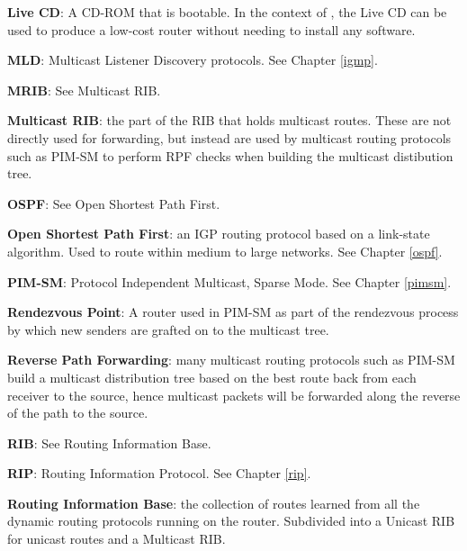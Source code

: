 \begin{description}
  \item{\bf Live CD}: A CD-ROM that is bootable.  In the context of
  \xorp, the Live CD can be used to produce a low-cost router without
  needing to install any software.

  \item{\bf MLD}: Multicast Listener Discovery protocols.  See Chapter
  \ref{igmp}.

  \item{\bf MRIB}: See Multicast RIB.

  \item{\bf Multicast RIB}: the part of the RIB that holds multicast routes.
  These are not directly used for forwarding, but instead are used by
  multicast routing protocols such as PIM-SM to perform RPF checks
  when building the multicast distibution tree.

  \item{\bf OSPF}: See Open Shortest Path First.

  \item{\bf Open Shortest Path First}: an IGP routing protocol based on
  a link-state algorithm.  Used to route within medium to large
  networks. See Chapter \ref{ospf}.

  \item{\bf PIM-SM}: Protocol Independent Multicast, Sparse Mode. See
  Chapter \ref{pimsm}.

  \item{\bf Rendezvous Point}: A router used in PIM-SM as part of the
  rendezvous process by which new senders are grafted on to the
  multicast tree.

  \item{\bf Reverse Path Forwarding}: many multicast routing protocols
  such as PIM-SM build a multicast distribution tree based on the best
  route back from each receiver to the source, hence multicast packets
  will be forwarded along the reverse of the path to the source.

  \item{\bf RIB}: See Routing Information Base.

  \item{\bf RIP}: Routing Information Protocol.  See Chapter \ref{rip}.

  \item{\bf Routing Information Base}: the collection of routes learned
  from all the dynamic routing protocols running on the router.
  Subdivided into a Unicast RIB for unicast routes and a Multicast RIB.


\end{description}
